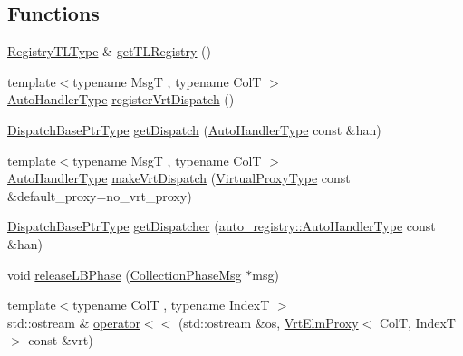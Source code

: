 \subsection*{Functions}
\begin{DoxyCompactItemize}
\item 
\hyperlink{namespacevt_1_1vrt_1_1collection_aecdad7ed4df3be1bab2a6bb9c5945964}{Registry\+T\+L\+Type} \& \hyperlink{namespacevt_1_1vrt_1_1collection_a37734c53d0e2984a2f914b4d0561ea30}{get\+T\+L\+Registry} ()
\item 
{\footnotesize template$<$typename MsgT , typename ColT $>$ }\\\hyperlink{namespacevt_1_1vrt_1_1collection_af50831782f9d77f86d626f858f295c37}{Auto\+Handler\+Type} \hyperlink{namespacevt_1_1vrt_1_1collection_a649287c1f71fd197febb94ecafbb3ca8}{register\+Vrt\+Dispatch} ()
\item 
\hyperlink{namespacevt_1_1vrt_1_1collection_aa3b9731ae16d60fac43d68840f3606a5}{Dispatch\+Base\+Ptr\+Type} \hyperlink{namespacevt_1_1vrt_1_1collection_a8c27db0d7f82d8e3568b48a38639066e}{get\+Dispatch} (\hyperlink{namespacevt_1_1vrt_1_1collection_af50831782f9d77f86d626f858f295c37}{Auto\+Handler\+Type} const \&han)
\item 
{\footnotesize template$<$typename MsgT , typename ColT $>$ }\\\hyperlink{namespacevt_1_1vrt_1_1collection_af50831782f9d77f86d626f858f295c37}{Auto\+Handler\+Type} \hyperlink{namespacevt_1_1vrt_1_1collection_ae4a11c02df4ec2be06edba8ecca82683}{make\+Vrt\+Dispatch} (\hyperlink{namespacevt_a1b417dd5d684f045bb58a0ede70045ac}{Virtual\+Proxy\+Type} const \&default\+\_\+proxy=no\+\_\+vrt\+\_\+proxy)
\item 
\hyperlink{namespacevt_1_1vrt_1_1collection_aa3b9731ae16d60fac43d68840f3606a5}{Dispatch\+Base\+Ptr\+Type} \hyperlink{namespacevt_1_1vrt_1_1collection_a3c8a78811494b4667d02836af84f9e71}{get\+Dispatcher} (\hyperlink{namespacevt_1_1auto__registry_ae295e18699146815bb7d7674594d95d7}{auto\+\_\+registry\+::\+Auto\+Handler\+Type} const \&han)
\item 
void \hyperlink{namespacevt_1_1vrt_1_1collection_a2c79a9043914424ca6d19bdbdc496bbf}{release\+L\+B\+Phase} (\hyperlink{structvt_1_1vrt_1_1collection_1_1_collection_phase_msg}{Collection\+Phase\+Msg} $\ast$msg)
\item 
{\footnotesize template$<$typename ColT , typename IndexT $>$ }\\std\+::ostream \& \hyperlink{namespacevt_1_1vrt_1_1collection_a45a536f39c0184e25512607398b7c364}{operator$<$$<$} (std\+::ostream \&os, \hyperlink{structvt_1_1vrt_1_1collection_1_1_vrt_elm_proxy}{Vrt\+Elm\+Proxy}$<$ ColT, IndexT $>$ const \&vrt)
\end{DoxyCompactItemize}


